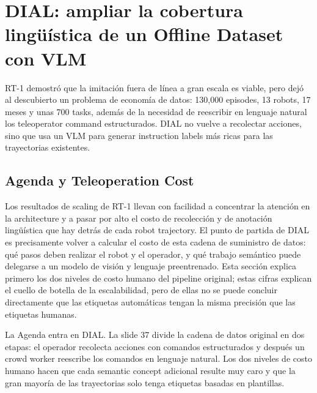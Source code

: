 \section{DIAL: ampliar la cobertura lingüística de un Offline Dataset con VLM}

RT-1 demostró que la imitación fuera de línea a gran escala es viable, pero dejó al descubierto un problema de economía de datos: 130,000 episodes, 13 robots, 17 meses y unas 700 tasks, además de la necesidad de reescribir en lenguaje natural los teleoperator command estructurados. DIAL no vuelve a recolectar acciones, sino que usa un VLM para generar instruction labels más ricas para las trayectorias existentes.

\subsection{Agenda y Teleoperation Cost}

Los resultados de scaling de RT-1 llevan con facilidad a concentrar la atención en la architecture y a pasar por alto el costo de recolección y de anotación lingüística que hay detrás de cada robot trajectory. El punto de partida de DIAL es precisamente volver a calcular el costo de esta cadena de suministro de datos: qué pasos deben realizar el robot y el operador, y qué trabajo semántico puede delegarse a un modelo de visión y lenguaje preentrenado. Esta sección explica primero los dos niveles de costo humano del pipeline original; estas cifras explican el cuello de botella de la escalabilidad, pero de ellas no se puede concluir directamente que las etiquetas automáticas tengan la misma precisión que las etiquetas humanas.

La Agenda entra en DIAL. La slide 37 divide la cadena de datos original en dos etapas: el operador recolecta acciones con comandos estructurados y después un crowd worker reescribe los comandos en lenguaje natural. Los dos niveles de costo humano hacen que cada semantic concept adicional resulte muy caro y que la gran mayoría de las trayectorias solo tenga etiquetas basadas en plantillas.




